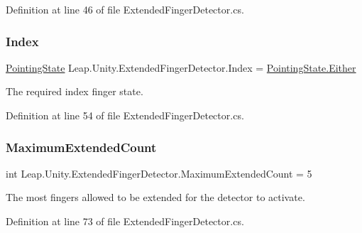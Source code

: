 Definition at line 46 of file Extended\+Finger\+Detector.\+cs.

\mbox{\label{class_leap_1_1_unity_1_1_extended_finger_detector_ae24e39831917ad570db7975b8454c4ac}} 
\subsubsection{\texorpdfstring{Index}{Index}}
{\footnotesize\ttfamily \mbox{\hyperlink{namespace_leap_1_1_unity_a1d316bf483102971171646a20de176fc}{Pointing\+State}} Leap.\+Unity.\+Extended\+Finger\+Detector.\+Index = \mbox{\hyperlink{namespace_leap_1_1_unity_a1d316bf483102971171646a20de176fca9e70a5d3dab1960c04b55a29f310331e}{Pointing\+State.\+Either}}}

The required index finger state. 

Definition at line 54 of file Extended\+Finger\+Detector.\+cs.

\mbox{\label{class_leap_1_1_unity_1_1_extended_finger_detector_a53da535a860f85c42cd383bbea4c3e67}} 
\subsubsection{\texorpdfstring{MaximumExtendedCount}{MaximumExtendedCount}}
{\footnotesize\ttfamily int Leap.\+Unity.\+Extended\+Finger\+Detector.\+Maximum\+Extended\+Count = 5}

The most fingers allowed to be extended for the detector to activate. 

Definition at line 73 of file Extended\+Finger\+Detector.\+cs.

\mbox{\label{class_leap_1_1_unity_1_1_extended_finger_detector_a15d5d4abb98b316c98ef8bdeb369d97a}} 
